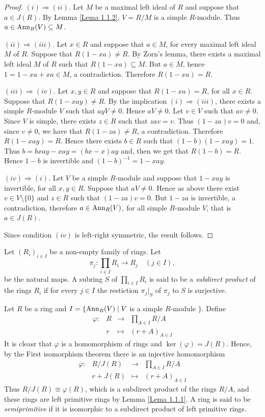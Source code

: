 \begin{proof}
$(i)\Rightarrow (ii)$. Let $M$ be a maximal left ideal of
$R$ and suppose that $a\in J(R)$. By Lemma \ref{Lema 1.1.2}, $V=R/M$ is a simple $R$-module. Thus $a\in \operatorname{Ann}_R(V)\subseteq M$.

$(ii)\Rightarrow (iii)$. Let $x\in R$ and suppose that $a\in  M$, for every maximal left ideal $M$ of $R$. Suppose that
$R(1-xa)\neq R$. By Zorn's lemma, there exists a maximal left ideal $M$ of $R$ such that
$R(1-xa)\subseteq M$. But $a\in M$, hence $1=1-xa+xa\in M$, a contradiction. Therefore $R(1-xa)=R$.

$(iii)\Rightarrow (iv)$. Let $x,y\in R$ and suppose that $R(1-xa)=R$, for all $x\in R$. Suppose that $R(1-xay)\neq
R$. By the implication $(i)\Rightarrow (iii)$, there exists a simple $R$-module $V$ such that $ayV\neq 0$. Hence $aV\neq 0$. 
Let $v\in V$ such that $av\neq
0$. Since $V$ is simple, there exists $z\in R$ such that $zav=v$. Thus
$(1-za)v=0$ and, since $v\neq 0$, we have that $R(1-za)\neq R$, a contradiction. Therefore $R(1-xay)=R$. Hence there exists $b\in R$
such that $(1-b)(1-xay)=1$. Thus $b=bxay-xay=(bx-x)ay$ and, then we get that $R(1-b)=R$. Hence $1-b$ is invertible 
and $(1-b)^{-1}=1-xay$.

$(iv)\Rightarrow (i)$. Let $V$ be a simple $R$-module and suppose that $1-xay$ is invertible, for all $x,y\in R$. 
Suppose that $aV\neq 0$. Hence as above there exist $v\in V\setminus\{ 0\}$ and $z\in R$
such that $(1-za)v=0$. But $1-za$ is invertible, a contradiction, therefore $a\in \operatorname{Ann}_R(V)$, for all simple $R$-module $V$, that is 
$a\in J(R)$. 

Since condition $(iv)$ is left-right symmetric, the result follows.
\end{proof}

Let $( R_i) _{i\in I}$ be a non-empty family of rings. Let
$$\pi_j\colon\prod_{i\in I}R_i\rightarrow R_j\quad (j\in I),$$
be the natural maps. A subring $S$ of $\prod_{i\in I}R_i$ is said to be a {\em subdirect product} of the rings $R_i$ if for every $j\in I$ the restiction $\pi_j|_S$ of $\pi_j$ to $S$ is surjective.

Let $R$ be a ring and $I=\{ \operatorname{Ann}_R(V)\mid V$ is a simple $R$-module $\}$. Define
$$\begin{array}{cccc}\varphi\colon &R&\rightarrow &\prod_{A\in I}R/A\\
&r&\mapsto &(r+A)_{A\in I}\end{array}$$
It is cleasr that $\varphi$ is a homomorphism of rings and $\ker(\varphi
)=J(R)$. Hence, by the First isomorphism theorem there is an injective homomorphism
$$\begin{array}{cccc}\overline{\varphi}\colon &R/J(R)&\rightarrow &\prod_{A\in I}R/A\\
&r+J(R)&\mapsto &(r+A)_{A\in I}\end{array}$$
Thus $R/J(R)\cong \varphi (R)$, which is a subdirect product of the rings $R/A$, and these rings are left primitive rings by Lemma \ref{Lema 1.1.1}. A ring is said to be {\em semiprimitive} if it is isomorphic to a subdirect product of left primitive rings.

